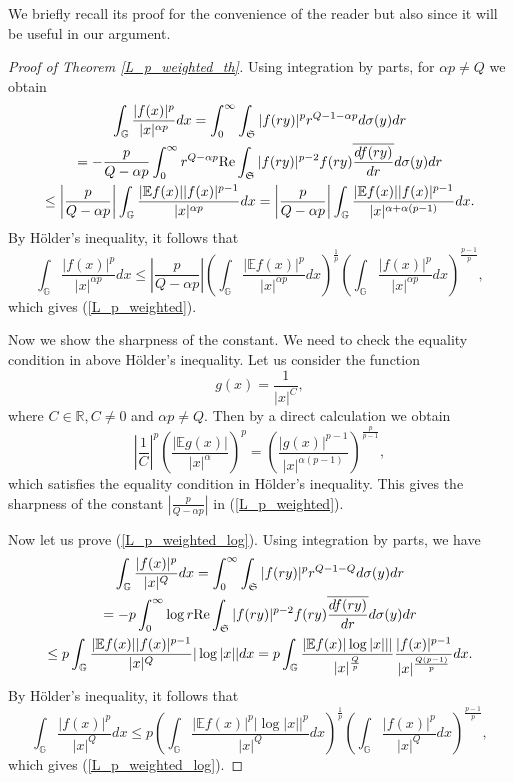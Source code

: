 \documentclass[a4paper,12pt,reqno]{amsart}
\renewcommand\eqref[1]{(\ref{#1})} %
\numberwithin{equation}{section}
\theoremstyle{plain}
\theoremstyle{definition}
\renewcommand{\wp}{\mathfrak S}
\begin{document}
We briefly recall its proof for the convenience of the reader but also since it will be useful in our argument.

\begin{proof}[Proof of Theorem \ref{L_p_weighted_th}]
Using integration by parts, for $\alpha p \neq Q$ we obtain
\begin{multline*}
\int_{\mathbb{G}}\frac{|f(x)|^{p}}{|x|^{\alpha p}}dx=\int_{0}^{\infty}\int_{\wp}|f(ry)|^{p}r^{Q-1-\alpha p}d\sigma(y)dr\\
=-\frac{p}{Q-\alpha p}\int_{0}^{\infty} r^{Q-\alpha p} {\rm Re} \int_{\wp}|f(ry)|^{p-2} f(ry) \overline{\frac{df(ry)}{dr}}d\sigma(y)dr\\
\leq \left|\frac{p}{Q-\alpha p}\right|\int_{\mathbb{G}}\frac{|\mathbb{E}f(x)||f(x)|^{p-1}}{|x|^{\alpha p}}dx=
\left|\frac{p}{Q-\alpha p}\right|\int_{\mathbb{G}}\frac{|\mathbb{E}f(x)||f(x)|^{p-1}}{|x|^{\alpha+\alpha (p-1)}}dx.
\end{multline*}
By H\"{o}lder's inequality, it follows that
$$
\int_{\mathbb{G}}\frac{|f(x)|^{p}}{|x|^{\alpha p}}dx\leq \left|\frac{p}{Q-\alpha p}\right|\left(\int_{\mathbb{G}}\frac{|\mathbb{E}f(x)|^{p}}{|x|^{\alpha p}}dx\right)
^{\frac{1}{p}}\left(\int_{\mathbb{G}}\frac{|f(x)|^{p}}{|x|^{\alpha p}}dx\right)^{\frac{p-1}{p}},
$$
which gives \eqref{L_p_weighted}.

Now we show the sharpness of the constant. We need to check the equality
condition in above H\"older's inequality.
Let us consider the function
\begin{equation}\label{2}
g(x)=\frac{1}{|x|^{C}},
\end{equation}
where $C\in\mathbb{R}, C\neq 0$ and $\alpha p\neq Q$. Then by a direct calculation we obtain
\begin{equation}\label{Holder_eq1}
\left|\frac{1}{C}\right|^{p}\left(\frac{|\mathbb{E}g(x)|}{|x|^{\alpha }}\right)^{p}=\left(\frac{|g(x)|^{p-1}}
{|x|^{\alpha (p-1)}}\right)^{\frac{p}{p-1}},
\end{equation}
which satisfies the equality condition in H\"older's inequality.
This gives the sharpness of the constant $\left|\frac{p}{Q-\alpha p}\right|$ in \eqref{L_p_weighted}.

Now let us prove \eqref{L_p_weighted_log}. Using integration by parts, we have
\begin{multline*}
\int_{\mathbb{G}}\frac{|f(x)|^{p}}{|x|^{Q}}dx=\int_{0}^{\infty}\int_{\wp}|f(ry)|^{p}r^{Q-1-Q}d\sigma(y)dr\\
=-p\int_{0}^{\infty} \log r {\rm Re} \int_{\wp}|f(ry)|^{p-2} f(ry) \overline{\frac{df(ry)}{dr}}d\sigma(y)dr\\
\leq p \int_{\mathbb{G}}\frac{|\mathbb{E}f(x)||f(x)|^{p-1}}{|x|^{Q}}|\log|x||dx=
p\int_{\mathbb{G}}\frac{|\mathbb{E}f(x)|\log|x|||}{|x|^{\frac{Q}{p}}}\frac{|f(x)|^{p-1}}{|x|^{\frac{Q(p-1)}{p}}}dx.
\end{multline*}
By H\"{o}lder's inequality, it follows that
$$
\int_{\mathbb{G}}\frac{|f(x)|^{p}}{|x|^{Q}}dx\leq p\left(\int_{\mathbb{G}}\frac{|\mathbb{E}f(x)|^{p}|\log|x||^{p}}{|x|^{Q}}dx\right)
^{\frac{1}{p}}\left(\int_{\mathbb{G}}\frac{|f(x)|^{p}}{|x|^{Q}}dx\right)^{\frac{p-1}{p}},
$$
which gives \eqref{L_p_weighted_log}.


\end{proof}
\end{document}
